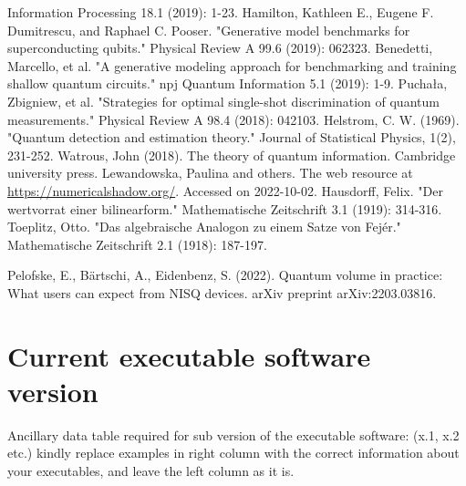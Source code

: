 \documentclass[preprint,12pt, a4paper, dvipsnames]{elsarticle}
\newcommand{\1}{{\rm 1\hspace{-0.9mm}l}}
\begin{document}
\begin{thebibliography}{00}
Information Processing 18.1 (2019): 1-23.
 Hamilton, Kathleen E., Eugene F. Dumitrescu,
and Raphael C. Pooser. "Generative model benchmarks for superconducting
qubits." Physical Review A 99.6 (2019): 062323.
 Benedetti, Marcello, et al. "A generative
modeling approach for benchmarking and training shallow quantum circuits." npj
Quantum Information 5.1 (2019): 1-9.
 Puchała, Zbigniew, et al. "Strategies for
optimal single-shot discrimination of quantum measurements." Physical Review A
98.4 (2018): 042103.
 Helstrom, C. W. (1969). "Quantum detection and estimation theory." Journal of Statistical Physics, 1(2), 231-252.
 Watrous, John (2018). The theory of quantum information. Cambridge university press.
 Lewandowska, Paulina and others. The web resource at \url{https://numericalshadow.org/}. Accessed on 2022-10-02.
 Hausdorff, Felix. "Der wertvorrat einer bilinearform." Mathematische Zeitschrift 3.1 (1919): 314-316.
 Toeplitz, Otto. "Das algebraische Analogon zu einem Satze von Fejér." Mathematische Zeitschrift 2.1 (1918): 187-197.

 Pelofske, E., B{\"a}rtschi, A., Eidenbenz, S. (2022). Quantum volume in practice: What users can expect from NISQ devices. arXiv preprint arXiv:2203.03816.
\end{thebibliography}



\section*{Current executable software version}
\label{}

Ancillary data table required for sub version of the executable software: (x.1,
x.2 etc.) kindly replace examples in right column with the correct information
about your executables, and leave the left column as it is.
\end{document}
